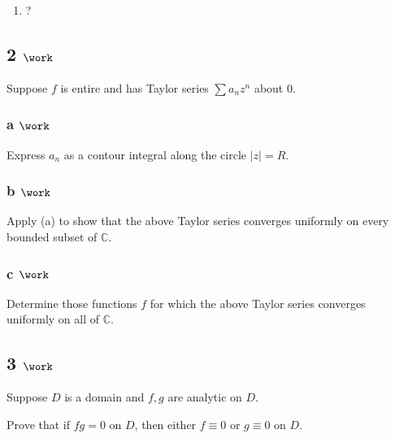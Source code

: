 \begin{solution}
\begin{enumerate}
\def\labelenumi{\alph{enumi}.}
\setcounter{enumi}{2}
\tightlist
\item
  ?
\end{enumerate}

\end{solution}

\hypertarget{work-35}{%
\subsection{\texorpdfstring{2
\(\work\)}{2 \textbackslash work}}\label{work-35}}

Suppose \(f\) is entire and has Taylor series \(\sum a_n z^n\) about 0.

\hypertarget{a-work-3}{%
\subsubsection{\texorpdfstring{a
\(\work\)}{a \textbackslash work}}\label{a-work-3}}

Express \(a_n\) as a contour integral along the circle
\({\left\lvert {z} \right\rvert} = R\).

\hypertarget{b-work-5}{%
\subsubsection{\texorpdfstring{b
\(\work\)}{b \textbackslash work}}\label{b-work-5}}

Apply (a) to show that the above Taylor series converges uniformly on
every bounded subset of \({\mathbb{C}}\).

\hypertarget{c-work-4}{%
\subsubsection{\texorpdfstring{c
\(\work\)}{c \textbackslash work}}\label{c-work-4}}

Determine those functions \(f\) for which the above Taylor series
converges uniformly on all of \({\mathbb{C}}\).

\hypertarget{work-36}{%
\subsection{\texorpdfstring{3
\(\work\)}{3 \textbackslash work}}\label{work-36}}

Suppose \(D\) is a domain and \(f, g\) are analytic on \(D\).

Prove that if \(fg = 0\) on \(D\), then either \(f \equiv 0\) or
\(g\equiv 0\) on \(D\).


